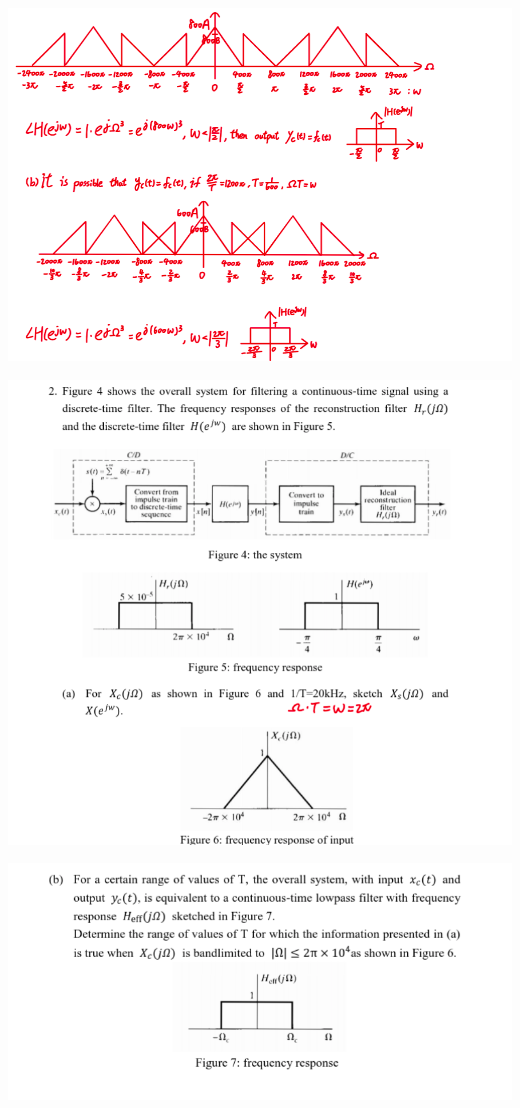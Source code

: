\documentclass[a4paper]{article}
\begin{document}
	
	\begin{center}
		\includegraphics[width=1\linewidth]{screenshot066}
	\end{center}
	
	
	
	\begin{center}
		\includegraphics[width=1\linewidth]{screenshot067}
	\end{center}
	
	\begin{center}
		\includegraphics[width=1\linewidth]{screenshot068}
	\end{center}
	
\end{document}
